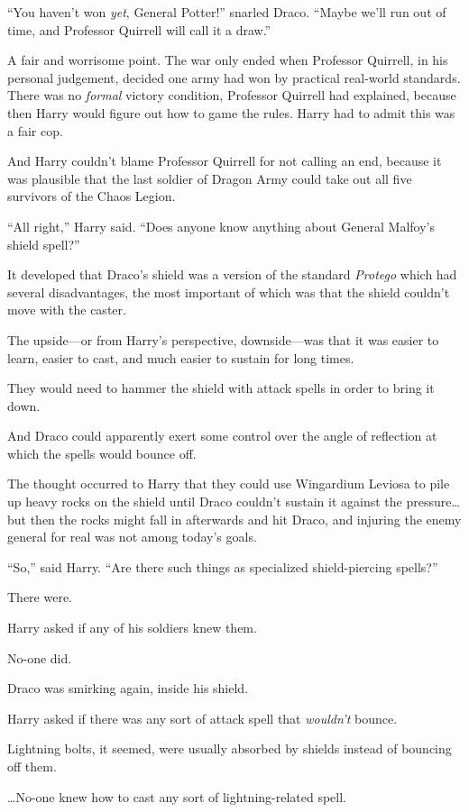 “You haven’t won \emph{yet}, General Potter!” snarled Draco. “Maybe we’ll run out of time, and Professor Quirrell will call it a draw.”

A fair and worrisome point. The war only ended when Professor Quirrell, in his personal judgement, decided one army had won by practical real-world standards. There was no \emph{formal} victory condition, Professor Quirrell had explained, because then Harry would figure out how to game the rules. Harry had to admit this was a fair cop.

And Harry couldn’t blame Professor Quirrell for not calling an end, because it was plausible that the last soldier of Dragon Army could take out all five survivors of the Chaos Legion.

“All right,” Harry said. “Does anyone know anything about General Malfoy’s shield spell?”

It developed that Draco’s shield was a version of the standard \emph{Protego} which had several disadvantages, the most important of which was that the shield couldn’t move with the caster.

The upside—or from Harry’s perspective, downside—was that it was easier to learn, easier to cast, and much easier to sustain for long times.

They would need to hammer the shield with attack spells in order to bring it down.

And Draco could apparently exert some control over the angle of reflection at which the spells would bounce off.

The thought occurred to Harry that they could use Wingardium Leviosa to pile up heavy rocks on the shield until Draco couldn’t sustain it against the pressure…but then the rocks might fall in afterwards and hit Draco, and injuring the enemy general for real was not among today’s goals.

“So,” said Harry. “Are there such things as specialized shield-piercing spells?”

There were.

Harry asked if any of his soldiers knew them.

No-one did.

Draco was smirking again, inside his shield.

Harry asked if there was any sort of attack spell that \emph{wouldn’t} bounce.

Lightning bolts, it seemed, were usually absorbed by shields instead of bouncing off them.

…No-one knew how to cast any sort of lightning-related spell.

